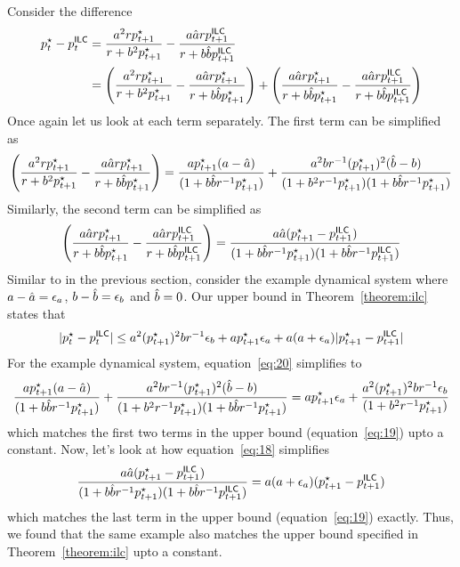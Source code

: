 Consider the difference
\begin{align*}
  p^\star_t - p^\mathsf{ILC}_t &= \frac{a^2rp^\star_{t+1}}{r + b^2p^\star_{t+1}} -
                       \frac{a\hat{a} rp^\mathsf{ILC}_{t+1}}{r +
                      b\hat{b}p^\mathsf{ILC}_{t+1}} \\
  &= \left( \frac{a^2rp^\star_{t+1}}{r + b^2p^\star_{t+1}} -
    \frac{a\hat{a} rp^\star_{t+1}}{r + b\hat{b}p^\star_{t+1}} \right) + \left(
    \frac{a\hat{a} rp^\star_{t+1}}{r + b\hat{b}p^\star_{t+1}} - \frac{a\hat{a} rp^\mathsf{ILC}_{t+1}}{r +
                      b\hat{b}p^\mathsf{ILC}_{t+1}}\right)
\end{align*}
Once again let us look at each term separately. The first term can be
simplified as
\begin{equation}
  \label{eq:20}
  \left( \frac{a^2rp^\star_{t+1}}{r + b^2p^\star_{t+1}} -
    \frac{a\hat{a} rp^\star_{t+1}}{r + b\hat{b}p^\star_{t+1}} \right) =
  \frac{ap^\star_{t+1}(a - \hat{a})}{(1 + b\hat{b} r^{-1}p^\star_{t+1})} +
  \frac{a^2br^{-1}(p^\star_{t+1})^2(\hat{b} - b)}{(1 + b^2r^{-1}p^\star_{t+1})(1
    + b\hat{b} r^{-1}p^\star_{t+1})}
\end{equation}
Similarly, the second term can be simplified as
\begin{equation}
  \label{eq:18}
  \left(
    \frac{a\hat{a} rp^\star_{t+1}}{r + b\hat{b}p^\star_{t+1}} - \frac{a\hat{a} rp^\mathsf{ILC}_{t+1}}{r +
                      b\hat{b}p^\mathsf{ILC}_{t+1}}\right) =
                  \frac{a\hat{a}(p^\star_{t+1} - p^\mathsf{ILC}_{t+1})}{(1 + b\hat{b}
                    r^{-1}p^\star_{t+1})(1 + b\hat{b} r^{-1}p^\mathsf{ILC}_{t+1})}
\end{equation}
Similar to \MM{} in the previous section, consider the example dynamical
system where $a - \hat{a} = \epsilon_a$, $b - \hat{b} = \epsilon_b$ and $\hat{b} =
0$. Our upper bound in Theorem~\ref{theorem:ilc} states that
\begin{equation}
  \label{eq:19}
  |p^\star_t - p^\mathsf{ILC}_t| \leq a^2(p^\star_{t+1})^2br^{-1}\epsilon_b +
  ap^\star_{t+1}\epsilon_a + a(a + \epsilon_a)|p^\star_{t+1} - p^\mathsf{ILC}_{t+1}|
\end{equation}
For the example dynamical system, equation~\eqref{eq:20} simplifies to
\begin{align*}
  \frac{ap^\star_{t+1}(a - \hat{a})}{(1 + b\hat{b} r^{-1}p^\star_{t+1})} +
  \frac{a^2br^{-1}(p^\star_{t+1})^2(\hat{b} - b)}{(1 + b^2r^{-1}p^\star_{t+1})(1
    + b\hat{b} r^{-1}p^\star_{t+1})} = ap^\star_{t+1}\epsilon_a +
  \frac{a^2(p^\star_{t+1})^2br^{-1}\epsilon_b}{(1 + b^2r^{-1}p^\star_{t+1})}
\end{align*}
which matches the first two terms in the upper bound
(equation~\eqref{eq:19}) upto a constant. Now, let's look at how
equation~\eqref{eq:18} simplifies
\begin{align*}
  \frac{a\hat{a}(p^\star_{t+1} - p^\mathsf{ILC}_{t+1})}{(1 + b\hat{b}
                    r^{-1}p^\star_{t+1})(1 + b\hat{b} r^{-1}p^\mathsf{ILC}_{t+1})}
  = a(a + \epsilon_a)(p^\star_{t+1} - p^\mathsf{ILC}_{t+1})
\end{align*}
which matches the last term in the upper bound
(equation~\eqref{eq:19}) exactly. Thus, we found that the same example
also matches the upper bound specified in Theorem~\ref{theorem:ilc}
upto a constant.

